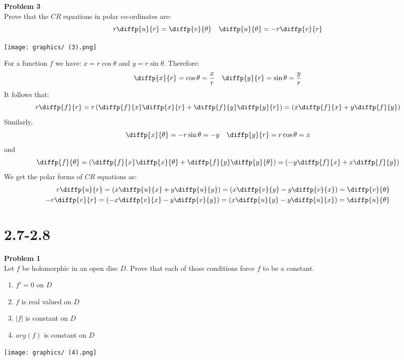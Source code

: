 \documentclass[12pt,oneside]{book}
\begin{document}
\begin{tcolorbox}[colback=blue!15]
    \textbf{Problem 3}\\
    Prove that the $CR$ equations in polar co-ordinates are:
    $$r\diffp{u}{r}=\diffp{v}{\theta}\quad \diffp{u}{\theta}=-r\diffp{v}{r}$$
\end{tcolorbox}
\begin{marginfigure}%
    \texttt{[image: graphics/ (3).png]}
\end{marginfigure}%
For a function $f$ we have: $x=r\cos\theta$ and $y=r\sin\theta$. Therefore:
    $$\diffp{x}{r}=\cos\theta=\frac{x}{r}\quad\diffp{y}{r}=\sin\theta=\frac{y}{r}$$
It follows that:
    $$r\diffp{f}{r}=r\left(\diffp{f}{x}\diffp{x}{r}+\diffp{f}{y}\diffp{y}{r}\right)=\left(x\diffp{f}{x}+y\diffp{f}{y}\right)$$ 
Similarly, 
$$\diffp{x}{\theta}=-r\sin\theta=-y\quad\diffp{y}{r}=r\cos\theta=x$$
and 
$$\diffp{f}{\theta}=\left(\diffp{f}{x}\diffp{x}{\theta}+\diffp{f}{y}\diffp{y}{\theta}\right)=\left(-y\diffp{f}{x}+x\diffp{f}{y}\right)$$
We get the polar forms of $CR$ equations as:
\begin{align*}
    r\diffp{u}{r}=\left(x\diffp{u}{x}+y\diffp{u}{y}\right)=\left(x\diffp{v}{y}-y\diffp{v}{x}\right)=\diffp{v}{\theta}\\
    -r\diffp{v}{r}=\left(-x\diffp{v}{x}-y\diffp{v}{y}\right)=\left(x\diffp{u}{y}-y\diffp{u}{x}\right)=\diffp{u}{\theta}
\end{align*}
\section{2.7-2.8}
\begin{tcolorbox}[colback=blue!15]
    \textbf{Problem 1}\\
    Let $f$ be holomorphic in an open disc $D$. Prove that each of those conditions force $f$ to be a constant.
    \begin{enumerate}
        \item $f'=0$ on $D$
        \item $f$ is real valued on $D$
        \item $|f|$ is constant on $D$
        \item $arg(f)$ is constant on $D$
    \end{enumerate}
\end{tcolorbox}
\begin{marginfigure}%
    \texttt{[image: graphics/ (4).png]}
\end{marginfigure}%
\end{document}
